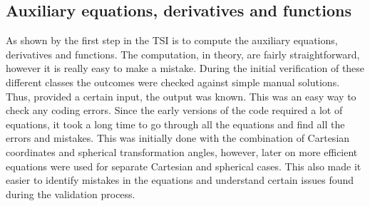 \subsection{Auxiliary equations, derivatives and functions}
\label{subsec:auxEqDerFunverval}
As shown by  the first step in the \ac{TSI} is to compute the auxiliary equations, derivatives and functions. The computation, in theory, are fairly straightforward, however it is really easy to make a mistake. During the initial verification of these different classes the outcomes were checked against simple manual solutions. Thus, provided a certain input, the output was known. This was an easy way to check any coding errors. Since the early versions of the code required a lot of equations, it took a long time to go through all the equations and find all the errors and mistakes. This was initially done with the combination of Cartesian coordinates and spherical transformation angles, however, later on more efficient equations were used for separate Cartesian and spherical cases. This also made it easier to identify mistakes in the equations and understand certain issues found during the validation process. 

